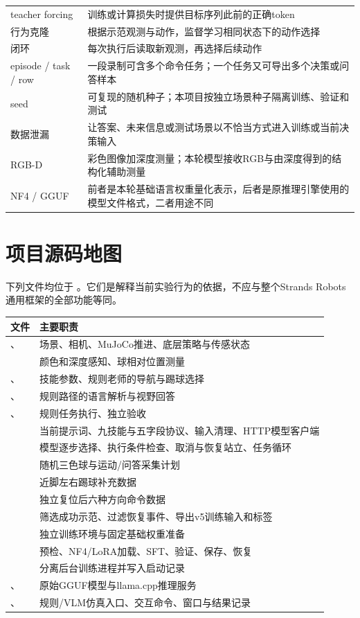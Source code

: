 \begin{longtable}{P{33mm}P{119mm}}
teacher forcing & 训练或计算损失时提供目标序列此前的正确token\\
行为克隆 & 根据示范观测与动作，监督学习相同状态下的动作选择\\
闭环 & 每次执行后读取新观测，再选择后续动作\\
episode / task / row & 一段录制可含多个命令任务；一个任务又可导出多个决策或问答样本\\
seed & 可复现的随机种子；本项目按独立场景种子隔离训练、验证和测试\\
数据泄漏 & 让答案、未来信息或测试场景以不恰当方式进入训练或当前决策输入\\
RGB-D & 彩色图像加深度测量；本轮模型接收RGB与由深度得到的结构化辅助测量\\
NF4 / GGUF & 前者是本轮基础语言权重量化表示，后者是原推理引擎使用的模型文件格式，二者用途不同\\
\bottomrule
\end{longtable}

\section{项目源码地图}
下列文件均位于 。它们是解释当前实验行为的依据，不应与整个Strands Robots通用框架的全部功能等同。
\begin{longtable}{P{55mm}P{96mm}}
\toprule
文件 & 主要职责\\
\midrule
\endhead
{}、 & 场景、相机、MuJoCo推进、底层策略与传感状态\\
 & 颜色和深度感知、球相对位置测量\\
、 & 技能参数、规则老师的导航与踢球选择\\
、 & 规则路径的语言解析与视野回答\\
、 & 规则任务执行、独立验收\\
 & 当前提示词、九技能与五字段协议、输入清理、HTTP模型客户端\\
 & 模型逐步选择、执行条件检查、取消与恢复站立、任务循环\\
 & 随机三色球与运动/问答采集计划\\
 & 近脚左右踢球补充数据\\
 & 独立复位后六种方向命令数据\\
 & 筛选成功示范、过滤恢复事件、导出v5训练输入和标签\\
 & 独立训练环境与固定基础权重准备\\
 & 预检、NF4/LoRA加载、SFT、验证、保存、恢复\\
 & 分离后台训练进程并写入启动记录\\
、 & 原始GGUF模型与llama.cpp推理服务\\
、 & 规则/VLM仿真入口、交互命令、窗口与结果记录\\
\bottomrule
\end{longtable}

